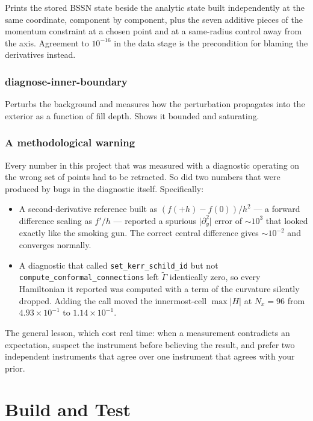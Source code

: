 \documentclass[11pt,openany]{book}
\newcommand{\Gt}{\tilde{\Gamma}}
\begin{document}
Prints the stored BSSN state beside the analytic state built independently at
the same coordinate, component by component, plus the seven additive pieces of
the momentum constraint at a chosen point and at a same-radius control away
from the axis. Agreement to $10^{-16}$ in the data stage is the precondition
for blaming the derivatives instead.

\subsection{diagnose-inner-boundary}

Perturbs the background and measures how the perturbation propagates into the
exterior as a function of fill depth. Shows it bounded and saturating.

\subsection{A methodological warning}

\gotcha
Every number in this project that was measured with a diagnostic operating on
the wrong set of points had to be retracted. So did two numbers that were
produced by bugs in the diagnostic itself. Specifically:
\begin{itemize}
\item A second-derivative reference built as $(f(+h) - f(0))/h^2$ --- a forward
      difference scaling as $f'/h$ --- reported a spurious
      $\lvert \partial_y^2\rvert$ error of $\sim 10^{3}$ that looked exactly
      like the smoking gun. The correct central difference gives $\sim10^{-2}$
      and converges normally.
\item A diagnostic that called \texttt{set\_kerr\_schild\_id} but not
      \texttt{compute\_conformal\_connections} left $\Gt$ identically zero, so
      every Hamiltonian it reported was computed with a term of the curvature
      silently dropped. Adding the call moved the innermost-cell $\max|H|$ at
      $N_x = 96$ from $4.93\times10^{-1}$ to $1.14\times10^{-1}$.
\end{itemize}

The general lesson, which cost real time: when a measurement contradicts an
expectation, suspect the instrument before believing the result, and prefer
two independent instruments that agree over one instrument that agrees with
your prior.

\chapter{Build and Test}
\label{ch:build}
\end{document}
